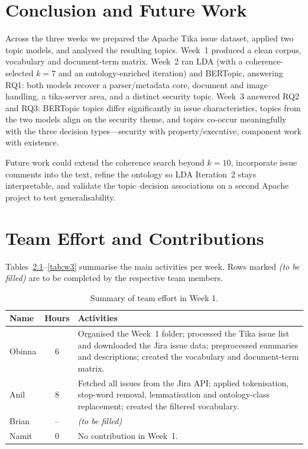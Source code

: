 \documentclass[11pt,a4paper]{report}
\begin{document}
\chapter{Conclusion and Future Work}
Across the three weeks we prepared the Apache Tika issue dataset, applied two
topic models, and analysed the resulting topics. Week~1 produced a clean corpus,
vocabulary and document-term matrix. Week~2 ran LDA (with a coherence-selected
$k=7$ and an ontology-enriched iteration) and BERTopic, answering RQ1: both
models recover a parser/metadata core, document and image handling, a
tika-server area, and a distinct security topic. Week~3 answered RQ2 and RQ3:
BERTopic topics differ significantly in issue characteristics, topics from the
two models align on the security theme, and topics co-occur meaningfully with
the three decision types---security with property/executive, component work with
existence.

Future work could extend the coherence search beyond $k=10$, incorporate issue
comments into the text, refine the ontology so LDA Iteration~2 stays
interpretable, and validate the topic--decision associations on a second Apache
project to test generalisability.

\appendix
\chapter{Team Effort and Contributions}
Tables~\ref{tab:w1}--\ref{tab:w3} summarise the main activities per week. Rows
marked \emph{(to be filled)} are to be completed by the respective team members.

\begin{table}[H]
  \centering
  \caption{Summary of team effort in Week 1.}
  \label{tab:w1}
  \begin{tabular}{p{3cm} c p{9cm}}
    \toprule
    \textbf{Name} & \textbf{Hours} & \textbf{Activities} \\
    \midrule
    Obinna & 6 & Organised the Week~1 folder; processed the Tika issue list and
                 downloaded the Jira issue data; preprocessed summaries and
                 descriptions; created the vocabulary and document-term matrix. \\
    Anil   & 8 & Fetched all issues from the Jira API; applied tokenisation,
                 stop-word removal, lemmatisation and ontology-class replacement;
                 created the filtered vocabulary. \\
    Brian  & -- & \textit{(to be filled)} \\
    Namit  & 0 & No contribution in Week~1. \\
    \bottomrule
  \end{tabular}
\end{table}
\end{document}
